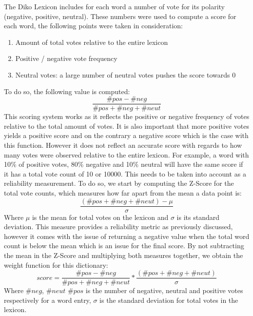 The Diko Lexicon includes for each word a number of vote for its polarity (negative, positive, neutral). These numbers were used to compute a score for each word, the following points were taken in consideration:
\begin{enumerate}
    \item Amount of total votes relative to the entire lexicon
    \item Positive / negative vote frequency
    \item Neutral votes: a large number of neutral votes pushes the score towards 0
\end{enumerate}
To do so, the following value is computed:
\begin{equation}
    \frac{\#pos - \#neg}{\#pos + \#neg + \#neut}
\end{equation}
This scoring system works as it reflects the positive or negative frequency of votes relative to the total amount of votes. It is also important that more positive votes yields a positive score and on the contrary a negative score which is the case with this function. However it does not reflect an accurate score with regards to how many votes were observed relative to the entire lexicon. For example, a word with 10\% of positive votes, 80\% negative and 10\% neutral will have the same score if it has a total vote count of 10 or 10000. This needs to be taken into account as a reliability measurement.
To do so, we start by computing the Z-Score for the total vote counts, which measures how far apart from the mean a data point is:
\begin{equation}
    \frac{(\#pos + \#neg + \#neut) - \mu}{\sigma}
\end{equation}
Where $\mu$ is the mean for total votes on the lexicon and $\sigma$ is its standard deviation. This measure provides a reliability metric as previously discussed, however it comes with the issue of returning a negative value when the total word count is below the mean which is an issue for the final score. By not subtracting the mean in the Z-Score and multiplying both measures together, we obtain the weight function for this dictionary:
\begin{equation}
\label{diko score}
    score = \frac{\#pos - \#neg}{\#pos + \#neg + \#neut} * \frac{(\#pos + \#neg + \#neut)}{\sigma}
\end{equation}
Where $\#neg$, $\#neut$ $\#pos$ is the number of negative, neutral and positive votes respectively for a word entry, $\sigma$ is the standard deviation for total votes in the lexicon.

